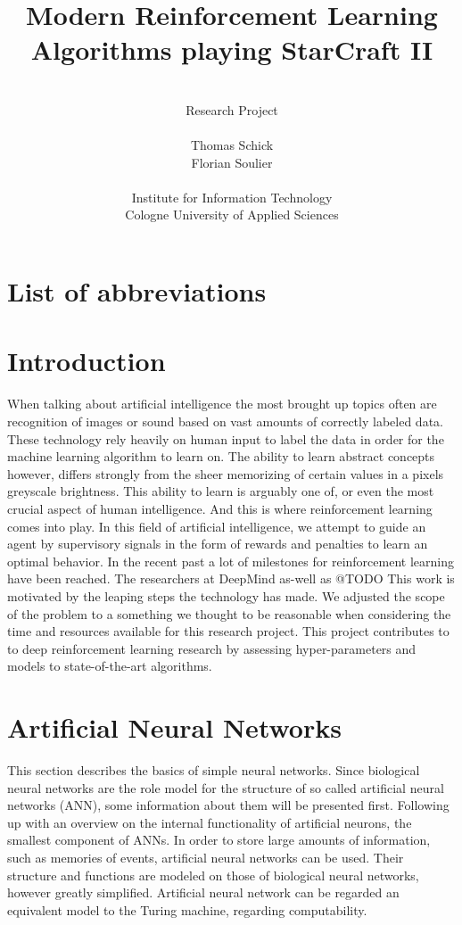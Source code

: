 \documentclass[12pt,a4paper]{article}
\author{\\Research Project\\ \\Thomas Schick\\Florian Soulier\\ \\ Institute for Information Technology\\
Cologne University of Applied Sciences}
\title{Modern Reinforcement Learning Algorithms playing StarCraft II}
\begin{document}
\noindent

\newpage
\tableofcontents{}
\newpage
\section*{List of abbreviations}

\newpage
{}
\section{Introduction} 
When talking about artificial intelligence the most brought up topics often are recognition of images or sound based on vast amounts of correctly labeled data.
These technology rely heavily on human input to label the data in order for the machine learning algorithm to learn on.
The ability to learn abstract concepts however, differs strongly from the sheer memorizing of certain values in a pixels greyscale brightness.
This ability to learn is arguably one of, or even the most crucial aspect of human intelligence. And this is where reinforcement learning comes into play.
In this field of artificial intelligence, we attempt to guide an agent by supervisory signals in the form of rewards and penalties to learn an optimal behavior.
In the recent past a lot of milestones for reinforcement learning have been reached. The researchers at DeepMind as-well as @TODO
This work is motivated by the leaping steps the technology has made.
We adjusted the scope of the problem to a something we thought to be reasonable when considering the time and resources available for this research project. 
This project contributes to to deep reinforcement learning research by assessing hyper-parameters and models to state-of-the-art algorithms.
\section{Artificial Neural Networks}
This section describes the basics of simple neural networks. Since biological neural networks are the role model for the structure of so called artificial neural networks (ANN), some information about them will be presented first.
Following up with an overview on the internal functionality of artificial neurons, the smallest component of ANNs.
In order to store large amounts of information, such as memories of events, artificial neural networks can be used. Their structure and functions are modeled on those of biological neural networks, however greatly simplified.
Artificial neural network can be regarded an equivalent model to the Turing machine, regarding computability.
\end{document}

